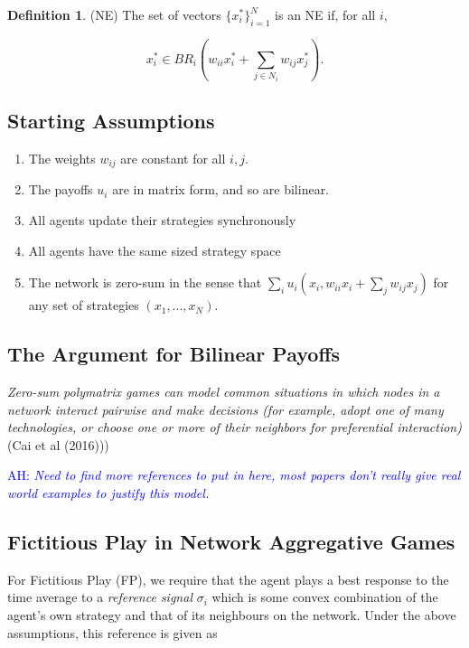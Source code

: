 \documentclass{article}
\theoremstyle{definition}
\newtheorem*{definition}{Definition}
\newcommand{\ah}[1]{\textcolor{blue}{AH: \textit{#1}}}
\begin{document}
	\begin{definition}(NE)
		The set of vectors $\{ x_i^*\}_{i = 1}^N$ is an NE if, for all $i$,
		
		\begin{equation*}
		x_i^* \in BR_i( w_{ii} x_i^* + \sum_{j \in N_i} w_{ij} x_j^*).
		\end{equation*}
		
	\end{definition}

	\subsection*{Starting Assumptions}
	
	\begin{enumerate}[I]
		\item The weights $w_{ij}$ are constant for all $i, j$.
		\item The payoffs $u_i$ are in matrix form, and so are bilinear.
		\item All agents update their strategies synchronously
		\item All agents have the same sized strategy space 
		\item The network is zero-sum in the sense that $\sum_i u_i(x_i, w_{ii} x_i + \sum_{j} w_{ij} x_j)$ for any set of strategies $(x_1, ..., x_N)$. 
	\end{enumerate}
	
	\subsection*{The Argument for Bilinear Payoffs}
	
	\textit{Zero-sum polymatrix games can model common situations in which nodes in a network interact pairwise and make decisions (for example, adopt one of many technologies, or choose one or more of their neighbors for preferential interaction)} (Cai et al (2016)))
	
	\ah{Need to find more references to put in here, most papers don't really give real world examples to justify this model.}
	
	\subsection*{Fictitious Play in Network Aggregative Games}
	
	For Fictitious Play (FP), we require that the agent plays a best response to the time average to a \emph{reference signal} $\sigma_i$ which is some convex combination of the agent's own strategy and that of its neighbours on the network. Under the above assumptions, this reference is given as
	
\end{document}
